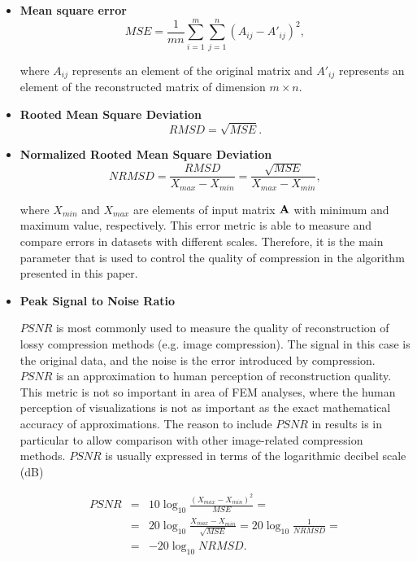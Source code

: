 \begin{itemize}
\item \textbf{Mean square error}
\begin{equation}
\mathit{MSE}=\frac{1}{m n} \sum_{i=1}^{m} \sum_{j=1}^{n} (A_{ij} - A'_{ij})^{2},
\label{eq:mse-def}
\end{equation}

\noindent
where $A_{ij}$ represents an element of the original matrix and $A'_{ij}$ represents an element of the
reconstructed matrix of dimension $m \times n$.

\item \textbf{Rooted Mean Square Deviation}
\begin{equation}
\mathit{RMSD} = \sqrt{\mathit{MSE}}.
\label{eq:rmsd-def}
\end{equation}

\item \textbf{Normalized Rooted Mean Square Deviation}
\begin{equation}
\mathit{NRMSD} = \frac{\mathit{RMSD}}{X_{max}-X_{min}}=\frac{\sqrt{\mathit{MSE}}}{X_{max}-X_{min}},
\label{eq:nrmsd-def}
\end{equation}

\noindent
where $X_{min}$ and $X_{max}$ are elements of input matrix $\mathbf{A}$ with minimum and maximum value, respectively. This error metric is able to measure and compare errors in datasets with different scales. Therefore, it is the main parameter that is used to control the quality of compression in the algorithm presented in this paper.

\item \textbf{Peak Signal to Noise Ratio}

$\mathit{PSNR}$ is most commonly used to measure the quality of reconstruction of lossy compression methods (e.g. image compression). The signal in this case is the original data, and the noise is the error introduced by compression. $\mathit{PSNR}$ is an approximation to human perception of reconstruction quality. This metric is not so important in area of FEM analyses, where the human perception of visualizations is not as important as the exact mathematical accuracy of approximations. The reason to include $\mathit{PSNR}$ in results is in particular to allow comparison with other image-related compression methods. $\mathit{PSNR}$ is usually expressed in terms of the logarithmic decibel scale (dB)

\begin{eqnarray}
\mathit{PSNR} &=& 10\log_{10}\frac{(X_{max}-X_{min})^{2}}{\mathit{MSE}} =
\\
&=& 20\log_{10}\frac{X_{max}-X_{min}}{\sqrt{\mathit{MSE}}}=20\log_{10}\frac{1}{\mathit{NRMSD}} = \nonumber
\\
&=& -20\log_{10}\mathit{NRMSD}. \nonumber
\label{eq:psnr-def}
\end{eqnarray}

\end{itemize}


